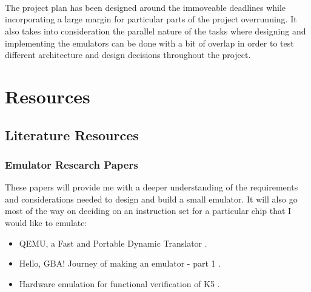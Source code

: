 \documentclass{article}
\begin{document}
\begin{center}
\begin{ganttchart}{1}{23}
   \\
   \\
 \\
 \ganttnewline
{} \ganttnewline
{} \ganttnewline
{} \ganttnewline
{} \ganttnewline
{} \ganttnewline
{} \ganttnewline
{}
\end{ganttchart}
\end{center}

The project plan has been designed around the immoveable deadlines while incorporating a large margin for particular 
parts of the project overrunning. It also takes into consideration the parallel nature of the tasks where designing 
and implementing the emulators can be done with a bit of overlap in order to test different architecture and design 
decisions throughout the project.

\section{Resources}

\subsection{Literature Resources}

\subsubsection{Emulator Research Papers}

These papers will provide me with a deeper understanding of the requirements and considerations needed to 
design and build a small emulator. It will also go most of the way on deciding on an instruction set for a 
particular chip that I would like to emulate:

\begin{itemize}
  \item QEMU, a Fast and Portable Dynamic Translator \citep{bellard2005qemu}.
  \item Hello, GBA! Journey of making an emulator - part 1 \citep{heily2020gameboy}.
  \item Hardware emulation for functional verification of K5 \citep{ganapathy1996k5}.
\end{itemize}
\end{document}
